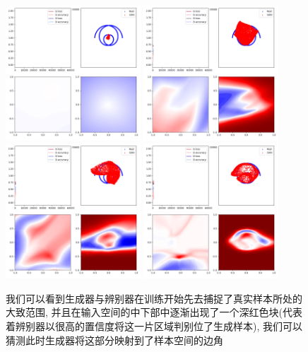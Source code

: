 \documentclass[lang=cn,11pt]{elegantpaper}
\begin{document}
\begin{figure}[hbt]
\centering
  \includegraphics[width=0.45\textwidth]{wings_2_1}
  \includegraphics[width=0.45\textwidth]{wings_2_2}\\
  \includegraphics[width=0.45\textwidth]{wings_2_3}
  \includegraphics[width=0.45\textwidth]{wings_2_4}
  \caption{我们可以看到生成器与辨别器在训练开始先去捕捉了真实样本所处的大致范围, 并且在输入空间的中下部中逐渐出现了一个深红色块(代表着辨别器以很高的置信度将这一片区域判别位了生成样本), 我们可以猜测此时生成器将这部分映射到了样本空间的边角}
\end{figure}
\end{document}
